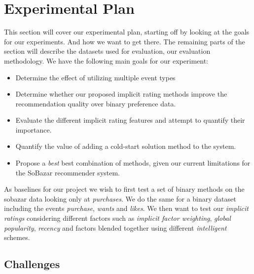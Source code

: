 \clearpage
\section{Experimental Plan}


This section will cover our experimental plan, starting off by looking at the
goals for our experiments. And how we want to get there. The remaining parts of
the section will describe the datasets used for evaluation, our evaluation methodology.
We have the following main goals for our experiment:

\begin{itemize}
	\item Determine the effect of utilizing multiple event types
	\item Determine whether our proposed implicit rating methods improve the recommendation quality over
	binary preference data.
	\item Evaluate the different implicit rating features and attempt to quantify their importance.
	\item Quantify the value of adding a cold-start solution method to the system.
	\item Propose a \emph{best} best combination of methods, given our current limitations for the SoBazar recommender system.
\end{itemize}

As baselines for our project we wish to first test a set of binary methods on the sobazar data
looking only at \emph{purchases}. We do the same for a binary dataset including the events
\emph{purchase}, \emph{wants} and \emph{likes}. We then want to test our \emph{implicit ratings}
considering different factors such as \emph{implicit factor weighting}, \emph{global popularity},
\emph{recency} and factors blended together using different \emph{intelligent} schemes.

\subsection{Challenges}

